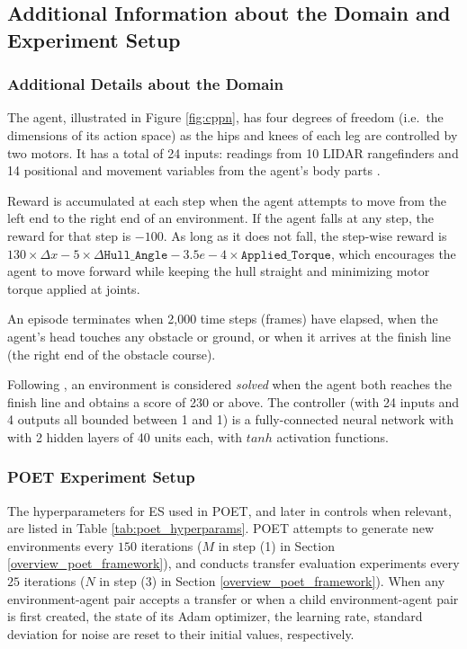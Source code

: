 \documentclass{article}
\newcommand{\todo}[1]{\comments{\textcolor{red}{[TODO: #1]}}}
\newcommand{\ar}[1]{\comments{\textcolor{orange}{[Aditya: #1]}}}
\newcommand{\comments}[1]{#1} %
\begin{document}
\subsection{Additional Information about the Domain and Experiment Setup}
\label{appedix:exp_setup}

\subsubsection{Additional Details about the Domain}
\label{appenidx:additional_domain_details}
The agent, illustrated in Figure \ref{fig:cppn}, has four degrees of freedom (i.e.\ the dimensions of its action space) as the hips and knees of each leg are controlled by two motors. It has a total of 24 inputs: readings from 10 LIDAR rangefinders and 14 positional and movement variables from the agent's body parts \cite{OpenAI_bipedal}.

Reward is accumulated at each step when the agent attempts to move from the left end to the right end of an environment. If the agent falls at any step, the reward for that step is $-100$. As long as it does not fall, the step-wise reward is $130 \times \Delta x-5\times\Delta \texttt{Hull\_Angle} - 3.5e-4\times \texttt{Applied\_Torque}$, which encourages the agent to move forward while keeping the hull straight and minimizing motor torque applied at joints. 

An episode terminates when 2,000 time steps (frames) have elapsed, when the agent's head touches any obstacle or ground, or when it arrives at the finish line (the right end of the obstacle course). 

Following \citet{wang2019paired,wang2019poetGECCO}, an environment is considered \emph{solved} when the agent both reaches the finish line and obtains a score of 230 or above. The controller (with 24 inputs and 4 outputs all bounded between \text{-}1 and 1) is a fully-connected neural network with with 2 hidden layers of 40 units each, with $tanh$ activation  functions. 



\subsubsection{POET Experiment Setup}

The hyperparameters for ES used in POET,  and later in controls when relevant, are listed in Table \ref{tab:poet_hyperparams}. POET attempts to generate new environments every $150$ iterations ($M$ in step (1) in Section \ref{overview_poet_framework}), and conducts transfer evaluation experiments every $25$ iterations ($N$ in step (3) in Section \ref{overview_poet_framework}). When any environment-agent pair accepts a transfer or when a child environment-agent pair is first created, the state of its Adam optimizer, the learning rate, standard deviation for noise are reset to their initial values, respectively. 
\end{document}
